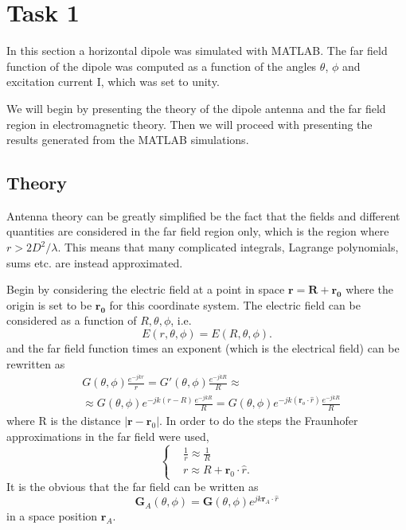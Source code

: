 \chapter{Task 1} 
\label{chapter:task1}
In this section a horizontal dipole was simulated with MATLAB. The far field function of the dipole was computed as a function of the angles $\theta$, $\phi$ and excitation current I, which was set to unity. 

We will begin by presenting the theory of the dipole antenna and the far field region in electromagnetic theory. Then we will proceed with presenting the results generated from the MATLAB simulations.  


\section{Theory}
Antenna theory can be greatly simplified be the fact that the fields and different quantities are considered in the far field region only, which is the region where $r > 2D^2/\lambda$. This means that many complicated integrals, Lagrange polynomials, sums  etc. are instead approximated.

Begin by considering the electric field at a point in space $\mathbf{r} = \mathbf{R} + \mathbf{r_0}$ where the origin is set to be $\mathbf{r_0}$ for this coordinate system. The electric field can be considered as a function of $R, \theta, \phi$, i.e. 
\begin{equation}
E(r, \theta, \phi) = E(R, \theta, \phi).
\end{equation}  
and  the far field function times an exponent (which is the electrical field) can be rewritten as 
\begin{align}
\label{elField}
&G( \theta, \phi) \frac{e^{-jkr}}{r} = G'( \theta, \phi) \frac{e^{-jkR}}{R} \approx \\
&\approx G( \theta, \phi) e^{-jk(r-R)}\frac{e^{-jkR}}{R} =  G( \theta, \phi) e^{-jk(\mathbf{r}_o\cdot \hat{r})}\frac{e^{-jkR}}{R}
\end{align}  
where R is the distance $|\mathbf{r} - \mathbf{r}_0|$. In order to do the steps the Fraunhofer approximations in the far field were used,
\begin{equation}
\begin{cases}
& \frac{1}{r} \approx \frac{1}{R} \\
& r \approx R + \mathbf{r}_0\cdot \hat{r}.
\end{cases}
\end{equation}
It is the obvious that the far field can be written as
\begin{equation}
\mathbf{G}_A(\theta, \phi) = \mathbf{G}(\theta, \phi)e^{jk\mathbf{r}_A\cdot \hat{r}} 
\end{equation}
in a space position $\mathbf{r}_A$.

